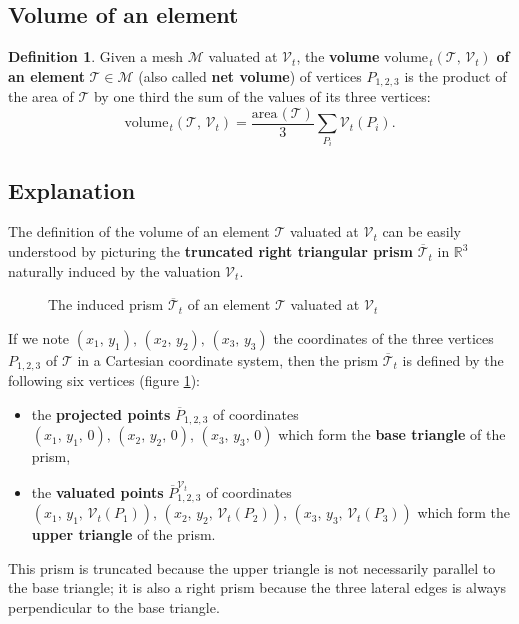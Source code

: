 \documentclass{article}
\theoremstyle{definition}
\newtheorem{defn}{Definition}
\newcommand{\RR}{\mathbb{R}}
\newcommand{\MM}{\mathcal{M}}
\newcommand{\VV}{\mathcal{V}}
\newcommand{\TT}{\mathcal{T}}
\newcommand{\area}{\mathrm{area}\hspace{1pt}}
\newcommand{\vol}{\mathrm{volume\hspace{1pt}}}
\begin{document}
\subsection{Volume of an element}
\begin{defn}
Given a mesh $\MM$ valuated at $\VV_t$, the \textbf{volume} $\vol_t(\TT,\,\VV_t)$ \textbf{of an element} $\TT\in\MM$ (also called \textbf{net volume}) of vertices $P_{1,2,3}$ is the product of the area of $\TT$ by one third the sum of the values of its three vertices:
\[\vol_t(\TT,\,\VV_t) = \frac{\area(\TT)}{3}
\sum_{P_i} \VV_t(P_i). \]
\label{def:volumeT}\end{defn}


\subsection{Explanation}
The definition of the volume of an element $\TT$ valuated at $\VV_t$ can be easily understood by picturing the \textbf{truncated right triangular prism} $\overline{\TT}_t$ in $\RR^3$ naturally induced by the valuation $\VV_t$.

\begin{figure}[ht!]
\centering 
  \caption{The induced prism $\overline{\TT}_t$ of an element $\TT$ valuated at $\VV_t$}
  \label{fig:prism}
\end{figure}

If we note $(x_1,\,y_1),\,(x_2,\,y_2),\,(x_3,\,y_3)$ the coordinates of the three vertices $P_{1,2,3}$ of $\TT$ in a Cartesian coordinate system, then the prism $\overline{\TT}_t$ is defined by the following six vertices (figure \ref{fig:prism}):
\begin{itemize}
\item the \textbf{projected points} $\overline{P}_{1,2,3}$ of coordinates $(x_1,\,y_1,\,0),\,(x_2,\,y_2,\,0),\,(x_3,\,y_3,\,0)$ which form the \textbf{base triangle} of the prism,
\item the \textbf{valuated points} $\overline{P}_{1,2,3}^{\VV_t}$ of coordinates $(x_1,\,y_1,\,\VV_t(P_1)),\,(x_2,\,y_2,\,\VV_t(P_2)),\,(x_3,\,y_3,\,\VV_t(P_3))$ which form the \textbf{upper triangle} of the prism.
\end{itemize}

This prism is truncated because the upper triangle is not necessarily parallel to the base triangle; it is also a right prism because the three lateral edges is always perpendicular to the base triangle.
\end{document}
